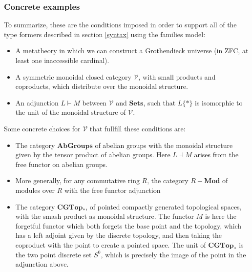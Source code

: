 \subsubsection{Concrete examples}
To summarize, these are the conditions imposed in order  to support all of the type formers described in section \ref{syntax} using the families model:
\begin{itemize}
\item A metatheory in which we can construct a Grothendieck universe (in ZFC, at least one inaccessible cardinal).
\item A symmetric monoidal closed category $\mathcal{V}$, with small products and coproducts, which distribute over the monoidal structure.
\item An adjunction $L \vdash M$ between $\mathcal{V}$ and $\mathbf{Sets}$, such that $L\{*\}$ is isomorphic to the unit of the monoidal structure of $\mathcal{V}$.
\end{itemize}
Some concrete choices for $\mathcal{V}$ that fullfill these conditions are:
\begin{itemize}
\item The category $\mathbf{AbGroups}$ of abelian groups with the monoidal structure given by the tensor product of abelian groups. Here $L \dashv M$ arises from the free functor on abelian groups.
\item More generally, for any commutative ring $R$, the category $R-\mathbf{Mod}$ of modules over $R$ with the free functor adjunction
\item The category $\mathbf{CGTop}_*$, of pointed compactly generated topological spaces, with the smash product as monoidal structure. The functor $M$ is here the forgetful functor which both forgets the base point and the topology, which has a left adjoint given by the discrete topology, and then taking the coproduct with the point to create a pointed space. The unit of $\mathbf{CGTop}_*$ is the two point discrete set $S^0$, which is precisely the image of the point in the adjunction above.
\end{itemize}

